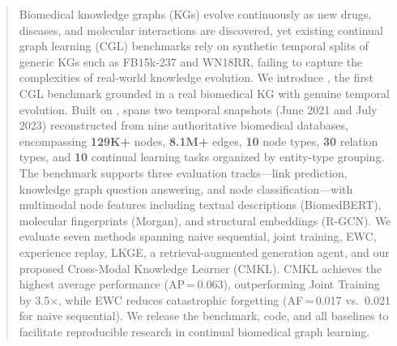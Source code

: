 \begin{abstract}
Biomedical knowledge graphs (KGs) evolve continuously as new drugs, diseases, and molecular interactions are discovered, yet existing continual graph learning (CGL) benchmarks rely on synthetic temporal splits of generic KGs such as FB15k-237 and WN18RR, failing to capture the complexities of real-world knowledge evolution.
We introduce \ours, the first CGL benchmark grounded in a real biomedical KG with genuine temporal evolution.
Built on \primekg, \ours spans two temporal snapshots (June 2021 and July 2023) reconstructed from nine authoritative biomedical databases, encompassing \textbf{129K+} nodes, \textbf{8.1M+} edges, \textbf{10} node types, \textbf{30} relation types, and \textbf{10} continual learning tasks organized by entity-type grouping.
The benchmark supports three evaluation tracks---link prediction, knowledge graph question answering, and node classification---with multimodal node features including textual descriptions (BiomedBERT), molecular fingerprints (Morgan), and structural embeddings (R-GCN).
We evaluate seven methods spanning naive sequential, joint training, EWC, experience replay, LKGE, a retrieval-augmented generation agent, and our proposed Cross-Modal Knowledge Learner (CMKL).
CMKL achieves the highest average performance (AP\,=\,0.063), outperforming Joint Training by 3.5$\times$, while EWC reduces catastrophic forgetting (AF\,=\,0.017 vs.\ 0.021 for naive sequential).
We release the benchmark, code, and all baselines to facilitate reproducible research in continual biomedical graph learning.
\end{abstract}
